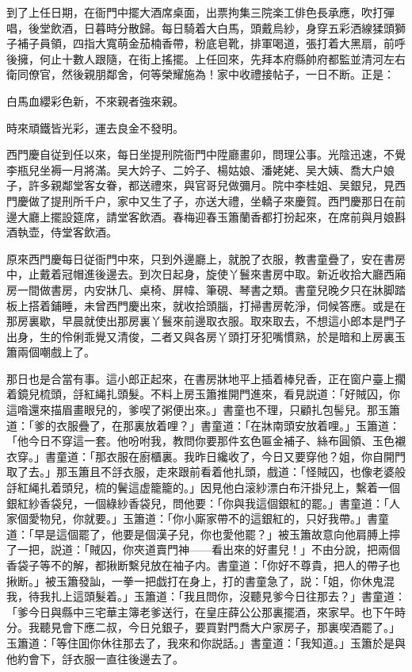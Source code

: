到了上任日期，在衙門中擺大酒席桌面，出票拘集三院楽工俳色長承應，吹打彈唱，後堂飲酒，日暮時分散歸。每日騎着大白馬，頭戴烏紗，身穿五彩洒線猱頭獅子補子員領，四指大寬萌金茄楠香帶，粉底皂靴，排軍喝道，張打着大黑扇，前呼後擁，何止十數人跟隨，在街上搖擺。上任回來，先拜本府縣帥府都監並清河左右衛同僚官，然後親朋鄰舍，何等榮耀施為！家中收禮接帖子，一日不断。正是：

\begin{myquote}
白馬血纓彩色新，不來親者強來親。

時來頑鐵皆光彩，運去良金不發明。
\end{myquote}

西門慶自従到任以來，每日坐提刑院衙門中陞廳畫卯，問理公事。光陰迅速，不覺李瓶兒坐褥一月將滿。吴大妗子、二妗子、楊姑娘、潘姥姥、吴大姨、喬大户娘子，許多親鄰堂客女眷，都送禮來，與官哥兒做彌月。院中李桂姐、吴銀兒，見西門慶做了提刑所千户，家中又生了子，亦送大禮，坐轎子來慶賀。西門慶那日在前邊大廳上擺設筵席，請堂客飲酒。春梅迎春玉簫蘭香都打扮起來，在席前與月娘斟酒執壶，侍堂客飲酒。

原來西門慶每日従衙門中來，只到外邊廳上，就脫了衣服，教書童疊了，安在書房中，止戴着冠帽進後邊去。到次日起身，旋使丫鬟來書房中取。新近收拾大廳西廂房一間做書房，内安牀几、桌椅、屏幃、筆硯、琴書之類。書童兒晚夕只在牀脚踏板上搭着鋪睡，未曾西門慶出來，就收拾頭腦，打掃書房乾淨，伺候答應。或是在那房裏歇，早晨就使出那房裏丫鬟來前邊取衣服。取來取去，不想這小郎本是門子出身，生的伶俐乖覺又清俊，二者又與各房丫頭打牙犯嘴慣熟，於是暗和上房裏玉簫兩個嘲戲上了。

那日也是合當有事。這小郎正起來，在書房牀地平上插着棒兒香，正在窗户臺上擱着鏡兒梳頭，㧱紅䋲扎頭髮。不料上房玉簫推開門進來，看見説道：「好賊囚，你這喒還來描眉畫眼兒的，爹喫了粥便出來。」書童也不理，只顧扎包髻兒。那玉簫道：「爹的衣服疊了，在那裏放着哩？」書童道：「在牀南頭安放着哩。」玉簫道：「他今日不穿這一套。他吩咐我，教問你要那件玄色匾金補子、絲布圓領、玉色襯衣穿。」書童道：「那衣服在廚櫃裏。我昨日纔收了，今日又要穿他？姐，你自開門取了去。」那玉簫且不㧱衣服，走來跟前看着他扎頭，戲道：「怪賊囚，也像老婆般㧱紅䋲扎着頭兒，梳的鬢這虚籠籠的。」因見他白滚紗漂白布汗掛兒上，繫着一個銀紅紗香袋兒，一個綠紗香袋兒，問他要：「你與我這個銀紅的罷。」書童道：「人家個愛物兒，你就要。」玉簫道：「你小廝家帶不的這銀紅的，只好我帶。」書童道：「早是這個罷了，他要是個漢子兒，你也愛他罷？」被玉簫故意向他肩膊上擰了一把，説道：「賊囚，你夾道賣門神——看出來的好畫兒！」不由分說，把兩個香袋子等不的解，都揪断繫兒放在袖子内。書童道：「你好不尊貴，把人的帶子也揪断。」被玉簫發訕，一拳一把戯打在身上，打的書童急了，説：「姐，你休鬼混我，待我扎上這頭髮着。」玉簫道：「我且問你，沒聽見爹今日往那去？」書童道：「爹今日與縣中三宅華主簿老爹送行，在皇庄薛公公那裏擺酒，來家早。也下午時分。我聽見會下應二叔，今日兑銀子，要買對門喬大户家房子，那裏喫酒罷了。」玉簫道：「等住囬你休往那去了，我來和你説話。」書童道：「我知道。」玉簫於是與他約會下，㧱衣服一直往後邊去了。

